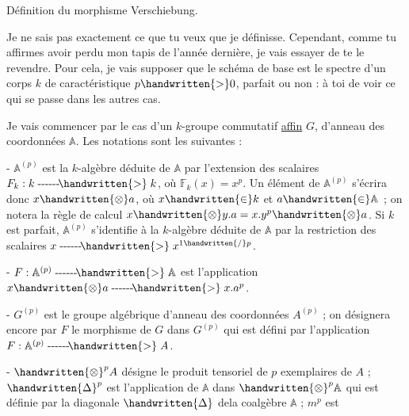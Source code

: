 
\begin{center}
Définition du morphisme Verschiebung.
\end{center}

Je ne sais pas exactement ce que tu veux que je définisse. Cependant, comme tu affirmes avoir perdu mon tapis de l'année dernière, je vais essayer de te le revendre. Pour cela, je vais supposer que le schéma de base est le spectre d'un corps $k$ de caractéristique $p\handwritten{>}0$, parfait ou non : à toi de voir ce qui se passe dans les autres cas.

Je vais commencer par le cas d'un $k$-groupe commutatif \uline{affin} $G$, d'anneau des coordonnées $\mathbb{A}$. Les notations sont les suivantes :

\noindent - $\mathbb{A}^{(p)}$ est la $k$-algèbre déduite de $\mathbb{A}$ par l'extension des scalaires $F_k:k\mathrel{\text{-{}-{}-{}-{}-{}-}\!\handwritten{>}}k$, où $\mathbb{F}_k(x)=x^p$. Un élément de $\mathbb{A}^{(p)}$ s'écrira donc $x\handwritten{\otimes}a$, où $x\handwritten{\in}k$ et $a\handwritten{\in}\mathbb{A}$ ; on notera la règle de calcul $x\handwritten{\otimes}y.a=x.y^p\handwritten{\otimes}a$. Si $k$ est parfait, $\mathbb{A}^{(p)}$ s'identifie à la $k$-algèbre déduite de $\mathbb{A}$ par la restriction des scalaires $x\mathrel{\text{-{}-{}-{}-{}-{}-}\!\handwritten{>}}x^{1\handwritten{/}p}$.

\noindent - $F:\mathbb{A}^{(p)}\mathrel{\text{-{}-{}-{}-{}-{}-}\!\handwritten{>}}\mathbb{A}$ est l'application  $x\handwritten{\otimes}a\mathrel{\text{-{}-{}-{}-{}-{}-}\!\handwritten{>}}x.a^p$.

\noindent - $G^{(p)}$ est le groupe algébrique d'anneau des coordonnées $A^{(p)}$ ; on désignera encore par $F$ le morphisme de $G$ dans $G^{(p)}$ qui est défini par l'application $F:\mathbb{A}^{(p)}\mathrel{\text{-{}-{}-{}-{}-{}-}\!\handwritten{>}}A$.

\noindent - $\handwritten{\otimes}^{p}A$ désigne le produit tensoriel de $p$ exemplaires de $A$ ; $\handwritten{\Delta}^{p}$ est l'application de $\mathbb{A}$ dans $\handwritten{\otimes}^{p}\mathbb{A}$ qui est définie par la diagonale $\handwritten{\Delta}$ dela coalgèbre $\mathbb{A}$ ; $m^p$ est

